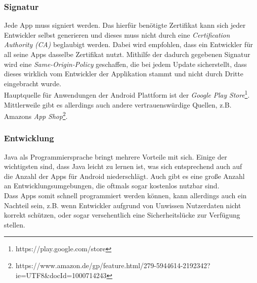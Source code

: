 	\subsubsection{Signatur}
	Jede App muss signiert werden. Das hierfür benötigte Zertifikat kann sich jeder
	Entwickler selbst generieren und dieses muss nicht durch eine
	\textit{Certification Authority (CA)} beglaubigt werden. Dabei wird empfohlen,
	dass ein Entwickler für all seine Apps dasselbe Zertifikat nutzt. Mithilfe der
	dadurch gegebenen Signatur wird eine \textit{Same-Origin-Policy} geschaffen,
	die bei jedem Update sicherstellt, dass dieses wirklich vom Entwickler der
	Applikation stammt und nicht durch Dritte eingebracht wurde.\\
	Hauptquelle für Anwendungen der Android Plattform ist der \textit{Google Play
	Store}\footnote{https://play.google.com/store}. Mittlerweile gibt es
	allerdings auch andere vertrauenswürdige Quellen, z.B. Amazons \textit{App
	Shop}\footnote{https://www.amazon.de/gp/feature.html/279-5944614-2192342?ie=UTF8\&docId=1000714243}.
	
	\subsubsection{Entwicklung}
	Java als Programmiersprache bringt mehrere Vorteile mit sich. Einige der
	wichtigsten sind, dass Java leicht zu lernen ist, was sich entsprechend auch
	auf die Anzahl der Apps für Android niederschlägt. Auch gibt es eine große
	Anzahl an Entwicklungsumgebungen, die oftmals sogar kostenlos nutzbar sind.\\
	Dass Apps somit schnell programmiert werden können, kann allerdings auch ein
	Nachteil sein, z.B. wenn Entwickler aufgrund von Unwissen Nutzerdaten nicht
	korrekt schützen, oder sogar versehentlich eine Sicherheitslücke zur Verfügung
	stellen.
